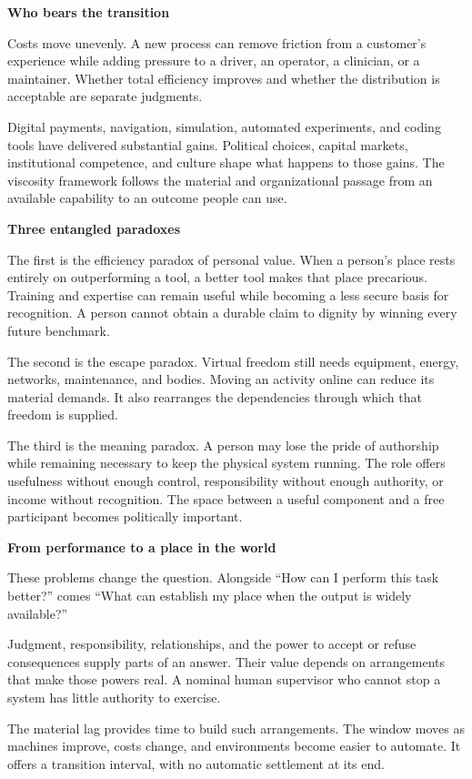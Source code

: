 \documentclass[11pt,openany]{book}
\newcommand{\subhead}[1]{\par\medskip\noindent\textbf{#1}\par\nobreak\smallskip}
\begin{document}
\subhead{Who bears the transition}

Costs move unevenly. A new process can remove friction from a customer's experience while adding pressure to a driver, an operator, a clinician, or a maintainer. Whether total efficiency improves and whether the distribution is acceptable are separate judgments.

Digital payments, navigation, simulation, automated experiments, and coding tools have delivered substantial gains. Political choices, capital markets, institutional competence, and culture shape what happens to those gains. The viscosity framework follows the material and organizational passage from an available capability to an outcome people can use.

\subhead{Three entangled paradoxes}

The first is the efficiency paradox of personal value. When a person's place rests entirely on outperforming a tool, a better tool makes that place precarious. Training and expertise can remain useful while becoming a less secure basis for recognition. A person cannot obtain a durable claim to dignity by winning every future benchmark.

The second is the escape paradox. Virtual freedom still needs equipment, energy, networks, maintenance, and bodies. Moving an activity online can reduce its material demands. It also rearranges the dependencies through which that freedom is supplied.

The third is the meaning paradox. A person may lose the pride of authorship while remaining necessary to keep the physical system running. The role offers usefulness without enough control, responsibility without enough authority, or income without recognition. The space between a useful component and a free participant becomes politically important.

\subhead{From performance to a place in the world}

These problems change the question. Alongside “How can I perform this task better?” comes “What can establish my place when the output is widely available?”

Judgment, responsibility, relationships, and the power to accept or refuse consequences supply parts of an answer. Their value depends on arrangements that make those powers real. A nominal human supervisor who cannot stop a system has little authority to exercise.

The material lag provides time to build such arrangements. The window moves as machines improve, costs change, and environments become easier to automate. It offers a transition interval, with no automatic settlement at its end.
\end{document}
